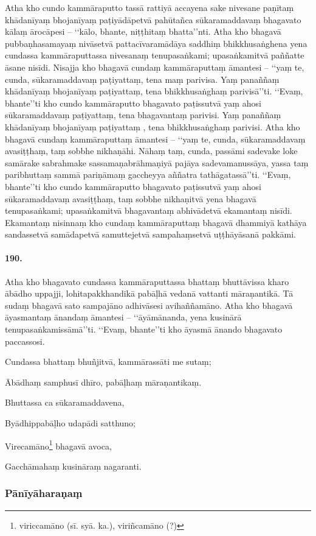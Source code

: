 Atha kho cundo kammāraputto tassā rattiyā accayena sake nivesane paṇītaṃ khādanīyaṃ bhojanīyaṃ paṭiyādāpetvā pahūtañca sūkaramaddavaṃ bhagavato kālaṃ ārocāpesi – ‘‘kālo, bhante, niṭṭhitaṃ bhatta’’nti. Atha kho bhagavā pubbaṇhasamayaṃ nivāsetvā pattacīvaramādāya saddhiṃ bhikkhusaṅghena yena cundassa kammāraputtassa nivesanaṃ tenupasaṅkami; upasaṅkamitvā paññatte āsane nisīdi. Nisajja kho bhagavā cundaṃ kammāraputtaṃ āmantesi – ‘‘yaṃ te, cunda, sūkaramaddavaṃ paṭiyattaṃ, tena maṃ parivisa. Yaṃ panaññaṃ khādanīyaṃ bhojanīyaṃ paṭiyattaṃ, tena bhikkhusaṅghaṃ parivisā’’ti. ‘‘Evaṃ, bhante’’ti kho cundo kammāraputto bhagavato paṭissutvā yaṃ ahosi sūkaramaddavaṃ paṭiyattaṃ, tena bhagavantaṃ parivisi. Yaṃ panaññaṃ khādanīyaṃ bhojanīyaṃ paṭiyattaṃ , tena bhikkhusaṅghaṃ parivisi. Atha kho bhagavā cundaṃ kammāraputtaṃ āmantesi – ‘‘yaṃ te, cunda, sūkaramaddavaṃ avasiṭṭhaṃ, taṃ sobbhe nikhaṇāhi. Nāhaṃ taṃ, cunda, passāmi sadevake loke samārake sabrahmake sassamaṇabrāhmaṇiyā pajāya sadevamanussāya, yassa taṃ paribhuttaṃ sammā pariṇāmaṃ gaccheyya aññatra tathāgatassā’’ti. ‘‘Evaṃ, bhante’’ti kho cundo kammāraputto bhagavato paṭissutvā yaṃ ahosi sūkaramaddavaṃ avasiṭṭhaṃ, taṃ sobbhe nikhaṇitvā yena bhagavā tenupasaṅkami; upasaṅkamitvā bhagavantaṃ abhivādetvā ekamantaṃ nisīdi. Ekamantaṃ nisinnaṃ kho cundaṃ kammāraputtaṃ bhagavā dhammiyā kathāya sandassetvā samādapetvā samuttejetvā sampahaṃsetvā uṭṭhāyāsanā pakkāmi.

\paragraph{190.} Atha kho bhagavato cundassa kammāraputtassa bhattaṃ bhuttāvissa kharo ābādho uppajji, lohitapakkhandikā pabāḷhā vedanā vattanti māraṇantikā. Tā sudaṃ bhagavā sato sampajāno adhivāsesi avihaññamāno. Atha kho bhagavā āyasmantaṃ ānandaṃ āmantesi – ‘‘āyāmānanda, yena kusinārā tenupasaṅkamissāmā’’ti. ‘‘Evaṃ, bhante’’ti kho āyasmā ānando bhagavato paccassosi.

Cundassa bhattaṃ bhuñjitvā, kammārassāti me sutaṃ;

Ābādhaṃ samphusī dhīro, pabāḷhaṃ māraṇantikaṃ.

Bhuttassa ca sūkaramaddavena,

Byādhippabāḷho udapādi satthuno;

Virecamāno\footnote{viriccamāno (sī. syā. ka.), viriñcamāno (?)} bhagavā avoca,

Gacchāmahaṃ kusināraṃ nagaranti.

\subsubsection{Pānīyāharaṇaṃ}

